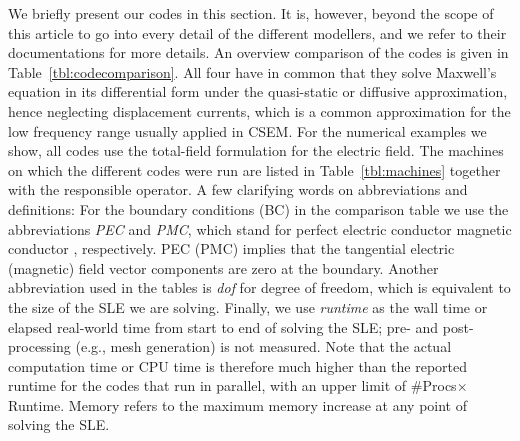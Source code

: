 \documentclass[a4paper, extra, camera,%
]{gji}
\begin{document}
We briefly present our codes in this section. It is, however, beyond the scope of this article to go into every detail of the different modellers, and we refer to their documentations for more details. An overview comparison of the codes is given in Table~\ref{tbl:codecomparison}. All four have in common that they solve Maxwell's equation in its differential form under the quasi-static or diffusive approximation, hence neglecting displacement currents, which is a common approximation for the low frequency range usually applied in CSEM. For the numerical examples we show, all codes use the total-field formulation for the electric field. The machines on which the different codes were run are listed in Table~\ref{tbl:machines} together with the responsible operator. A few clarifying words on abbreviations and definitions: For the boundary conditions (BC) in the comparison table we use the abbreviations \emph{PEC} and \emph{PMC}, which stand for perfect electric conductor magnetic conductor
, respectively. PEC (PMC) implies that the tangential electric (magnetic) field vector components are zero at the boundary. Another abbreviation used in the tables is \emph{dof} for degree of freedom, which is equivalent to the size of the SLE we are solving. Finally, we use \emph{runtime} as the wall time or elapsed real-world time from start to end of solving the SLE; pre- and post-processing (e.g., mesh generation) is not measured. Note that the actual computation time or CPU time is therefore much higher than the reported runtime for the codes that run in parallel, with an upper limit of \#Procs$\times$Runtime. Memory refers to the maximum memory increase at any point of solving the SLE.
\end{document}
